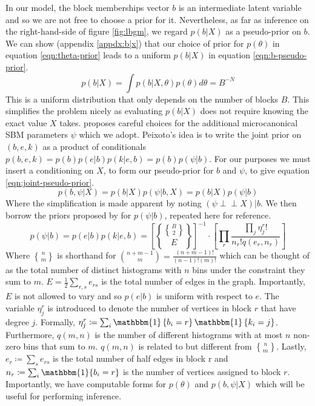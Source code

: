 \documentclass{article}
\newcommand{\one}{\mathbbm{1}}
\newcommand{\indep}{\perp \!\!\! \perp}
\newcommand{\specialchoose}{\genfrac{\{}{\}}{0pt}{}}
\begin{document}
In our model, the block memberships vector $b$ is an intermediate latent variable and so we are not free to choose a prior for it. Nevertheless, as far as inference on the right-hand-side of figure \ref{fig:lbgm}, we regard $p(b | X)$ as a pseudo-prior on $b$. We can show (appendix \ref{appdx:b|x}) that our choice of prior for $p(\theta)$ in equation \ref{eqn:theta-prior} leads to a uniform $p(b | X)$ in equation \ref{eqn:b-pseudo-prior}.
%
\begin{equation}
	p(b | X) = \int p(b | X, \theta) p(\theta) d\theta = B^{-N}
	\label{eqn:b-pseudo-prior}
\end{equation}
%
This is a uniform distribution that only depends on the number of blocks $B$. This simplifies the problem nicely as evaluating $p(b | X)$ does not require knowing the exact value $X$ takes. \citet{Peixoto-Bayesian-Microcanonical} proposes careful choices for the additional microcanonical SBM parameters $\psi$ which we adopt. Peixoto's idea is to write the joint prior on $(b, e, k)$ as a product of conditionals $p(b, e, k) = p(b) p(e | b) p(k | e, b)= p(b) p(\psi | b)$. For our purposes we must insert a conditioning on $X$, to form our pseudo-prior for $b$ and $\psi$, to give equation \ref{eqn:joint-pseudo-prior}.
%
\begin{equation}
	p(b, \psi | X) = p(b | X) p(\psi | b, X) = p(b | X) p(\psi | b)
	\label{eqn:joint-pseudo-prior}
\end{equation}
%
Where the simplification is made apparent by noting $(\psi \indep X) | b$. We then borrow the priors proposed by \citet{Peixoto-Bayesian-Microcanonical} for $p(\psi | b)$, repeated here for reference.
%
\begin{equation}
	p(\psi | b) = p(e | b) p(k | e, b) = \left[ \specialchoose{ \specialchoose{B}{2} }{ E} \right]^{-1} 
	\cdot \left[ \prod_r \frac{\prod_j \eta_j^r !}{n_r! q(e_r, n_r)} \right]
\end{equation}
%
Where $\specialchoose{n}{m}$ is shorthand for $\binom{n+m-1}{m} = \frac{(n+m-1)!}{(n-1)!(m)!}$ which can be thought of as the total number of distinct histograms with $n$ bins under the constraint they sum to $m$. $E = \frac{1}{2} \sum_{r,s} e_{rs}$ is the total number of edges in the graph. Importantly, $E$ is not allowed to vary and so $p(e|b)$ is uniform with respect to $e$. The variable $\eta_j^r$ is introduced to denote the number of vertices in block $r$ that have degree $j$. Formally, $\eta_j^r \coloneqq \sum_{i} \one\left\{b_i = r \right\} \one \left\{k_i = j \right\}$. Furthermore, $q(m, n)$ is the number of different histograms with at most $n$ non-zero bins that sum to $m$. $q(m, n)$ is related to but different from $\specialchoose{n}{m}$. Lastly, $e_r \coloneqq \sum_{s} e_{rs}$ is the total number of half edges in block r and $n_r \coloneqq \sum_{i} \one\{b_i = r\}$ is the number of vertices assigned to block $r$. Importantly, we have computable forms for $p(\theta)$ and $p(b, \psi | X)$ which will be useful for performing inference.
\end{document}
